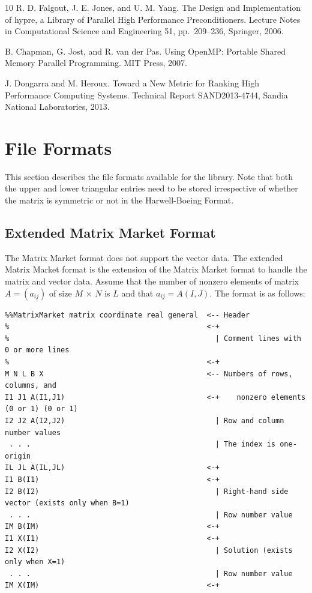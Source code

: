 \documentclass[a4paper]{article}
\begin{document}
\begin{thebibliography}{10}
R. D. Falgout, J. E. Jones, and U. M. Yang.
\newblock The Design and Implementation of hypre, a Library of Parallel
	High Performance Preconditioners.
\newblock Lecture Notes in Computational Science and Engineering 51, pp.\ 209--236, Springer, 2006.

B. Chapman, G. Jost, and R. van der Pas.
\newblock Using OpenMP: Portable Shared Memory Parallel Programming.
\newblock MIT Press, 2007.

J. Dongarra and M. Heroux.
\newblock Toward a New Metric for Ranking High Performance Computing Systems.
\newblock Technical Report SAND2013-4744, Sandia National Laboratories, 2013.

\end{thebibliography}

\newpage
\appendix
\section{File Formats}
\label{sec:matinp}
This section describes the file formats available for the library.
Note that both the upper and lower triangular entries need to be stored
irrespective of whether the matrix is symmetric or not in the
Harwell-Boeing Format. 

\subsection{Extended Matrix Market Format}
The Matrix Market format does not support 
the vector data. The extended Matrix Market format is the extension of
the Matrix Market format to handle 
the matrix and vector data. Assume that the number of nonzero elements of
matrix $A=(a_{ij})$ of size $M$ $\times$ $N$ is $L$ and 
that $a_{ij} = A(I,J)$. The format is as follows: 

{\small
\begin{verbatim}
%%MatrixMarket matrix coordinate real general  <-- Header
%                                              <-+ 
%                                                | Comment lines with 0 or more lines
%                                              <-+
M N L B X                                      <-- Numbers of rows, columns, and 
I1 J1 A(I1,J1)                                 <-+    nonzero elements (0 or 1) (0 or 1)
I2 J2 A(I2,J2)                                   | Row and column number values
 . . .                                           | The index is one-origin
IL JL A(IL,JL)                                 <-+
I1 B(I1)                                       <-+
I2 B(I2)                                         | Right-hand side vector (exists only when B=1)
 . . .                                           | Row number value
IM B(IM)                                       <-+
I1 X(I1)                                       <-+
I2 X(I2)                                         | Solution (exists only when X=1)
 . . .                                           | Row number value
IM X(IM)                                       <-+
\end{verbatim}
}
\end{document}
